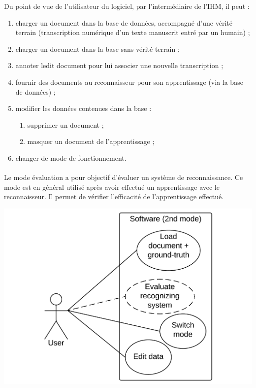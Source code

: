 Du point de vue de l'utilisateur du logiciel, par l’intermédiaire de l’IHM, il
peut :
\begin{enumerate}
\item charger un document dans la base de données, accompagné d’une vérité
terrain (transcription numérique d'un texte manuscrit entré par un humain) ;
\item charger un document dans la base sans vérité terrain ;
\item annoter ledit document pour lui associer une nouvelle transcription ;
\item fournir des documents au reconnaisseur pour son apprentissage (via la base de données) ;
\item modifier les données contenues dans la base :
\begin{enumerate}
\item supprimer un document ;
\item masquer un document de l’apprentissage ;
\end{enumerate}
\item changer de mode de fonctionnement.
\end{enumerate}

\paragraph{}

\paragraph{}
Le mode évaluation a pour objectif d’évaluer un système de reconnaissance. Ce
mode est en général utilisé après avoir effectué un apprentissage avec le
reconnaisseur. Il permet de vérifier l’efficacité de l’apprentissage effectué.

\begin{mdframed}[frametitle={Figure 3 : Diagramme de cas d'utilisation (mode évaluation)}, innerbottommargin=10]
\begin{center}
\includegraphics[scale=0.4]{Usecase_2.pdf}
\end{center}
\end{mdframed}

